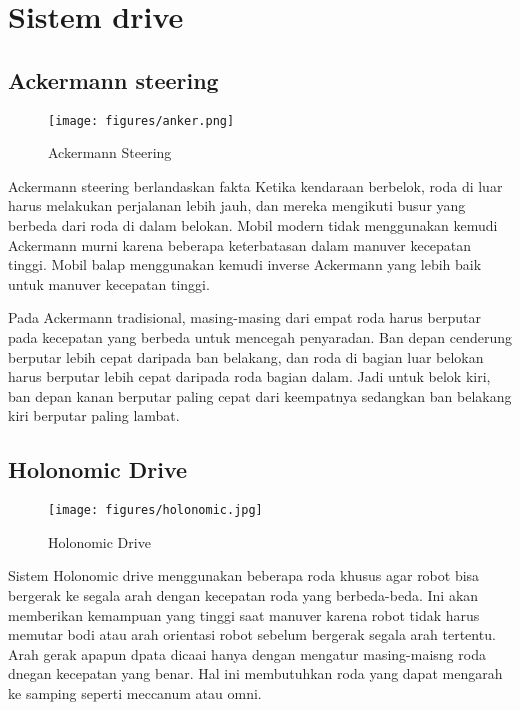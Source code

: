 \section{Sistem drive}
\subsection{Ackermann steering}
\begin{figure}[!htb]
 \centering
\texttt{[image: figures/anker.png]}
 \caption{Ackermann Steering}
 \label{fig:acker}
\end{figure}

Ackermann steering berlandaskan fakta Ketika kendaraan berbelok, roda di luar harus melakukan perjalanan lebih jauh, dan mereka mengikuti busur yang berbeda dari roda di dalam belokan. Mobil modern tidak menggunakan kemudi Ackermann murni karena beberapa keterbatasan dalam manuver kecepatan tinggi. Mobil balap menggunakan kemudi inverse Ackermann yang lebih baik untuk manuver kecepatan tinggi.\par
Pada Ackermann tradisional, masing-masing dari empat roda harus berputar pada kecepatan yang berbeda untuk mencegah penyaradan. Ban depan cenderung berputar lebih cepat daripada ban belakang, dan roda di bagian luar belokan harus berputar lebih cepat daripada roda bagian dalam. Jadi untuk belok kiri, ban depan kanan berputar paling cepat dari keempatnya sedangkan ban belakang kiri berputar paling lambat.
\subsection{Holonomic Drive}
\begin{figure}[!htb]
 \centering
\texttt{[image: figures/holonomic.jpg]}
 \caption{Holonomic Drive}
 \label{fig:hol}
\end{figure}
Sistem Holonomic drive menggunakan beberapa roda khusus agar robot bisa bergerak ke segala arah dengan kecepatan roda yang berbeda-beda. Ini akan memberikan kemampuan yang tinggi saat manuver karena robot tidak harus memutar bodi atau arah orientasi robot sebelum bergerak segala arah tertentu. Arah gerak apapun dpata dicaai hanya dengan mengatur masing-maisng roda dnegan kecepatan yang benar. Hal ini membutuhkan roda yang dapat mengarah ke samping seperti meccanum atau omni. 
